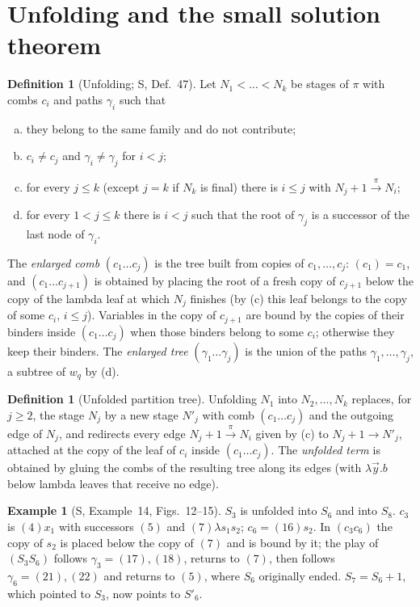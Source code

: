 \documentclass[11pt]{article}
\newcommand{\ra}[1]{\xrightarrow{#1}}
\theoremstyle{plain}
\theoremstyle{definition}
\newtheorem{definition}[theorem]{Definition}
\newtheorem{example}[theorem]{Example}
\theoremstyle{remark}
\begin{document}
\section{Unfolding and the small solution theorem}

\begin{definition}[Unfolding; S, Def.~47]\label{def:unfold}
Let $N_1<\dots<N_k$ be stages of $\pi$ with combs $c_i$ and paths
$\gamma_i$ such that
\begin{enumerate}[(a)]
\item they belong to the same family and do not contribute;
\item $c_i\ne c_j$ and $\gamma_i\ne\gamma_j$ for $i<j$;
\item for every $j\le k$ (except $j=k$ if $N_k$ is final) there is
  $i\le j$ with $N_j+1\ra\pi N_i$;
\item for every $1<j\le k$ there is $i<j$ such that the root of
  $\gamma_j$ is a successor of the last node of $\gamma_i$.
\end{enumerate}
The \emph{enlarged comb} $(c_1\dots c_j)$ is the tree built from copies
of $c_1,\dots,c_j$: $(c_1)=c_1$, and $(c_1\dots c_{j+1})$ is obtained by
placing the root of a fresh copy of $c_{j+1}$ below the copy of the
lambda leaf at which $N_j$ finishes (by (c) this leaf belongs to the
copy of some $c_i$, $i\le j$).  Variables in the copy of $c_{j+1}$ are
bound by the copies of their binders inside $(c_1\dots c_j)$ when those
binders belong to some $c_i$; otherwise they keep their binders.  The
\emph{enlarged tree} $(\gamma_1\dots\gamma_j)$ is the union of the paths
$\gamma_1,\dots,\gamma_j$, a subtree of $w_q$ by (d).
\end{definition}

\begin{definition}[Unfolded partition tree]\label{def:unfolded-tree}
Unfolding $N_1$ into $N_2,\dots,N_k$ replaces, for $j\ge2$, the stage
$N_j$ by a new stage $N'_j$ with comb $(c_1\dots c_j)$ and the outgoing
edge of $N_j$, and redirects every edge $N_j+1\ra\pi N_i$ given by (c) to
$N_j+1\ra{} N'_j$, attached at the copy of the leaf of $c_i$ inside
$(c_1\dots c_j)$.  The \emph{unfolded term} is obtained by gluing the
combs of the resulting tree along its edges (with $\lambda\vec y.b$ below
lambda leaves that receive no edge).
\end{definition}

\begin{example}[S, Example~14, Figs.~12--15]
$S_3$ is unfolded into $S_6$ and into $S_8$.  $c_3$ is $(4)x_1$ with
successors $(5)$ and $(7)\lambda s_1s_2$; $c_6=(16)s_2$.  In $(c_3c_6)$ the
copy of $s_2$ is placed below the copy of $(7)$ and is bound by it; the
play of $(S_3S_6)$ follows $\gamma_3=(17),(18)$, returns to $(7)$, then
follows $\gamma_6=(21),(22)$ and returns to $(5)$, where $S_6$ originally
ended.  $S_7=S_6+1$, which pointed to $S_3$, now points to $S'_6$.
\end{example}
\end{document}
